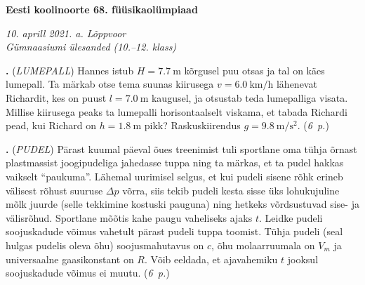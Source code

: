 \documentclass[11pt,a5paper]{article}
\newcommand{\numb}[1]{\vspace{5pt}\textbf{\large #1}}
\newcommand{\nimi}[1]{(\textsl{\small #1})}
\newcommand{\punktid}[1]{(\emph{#1~p.})}
\newcounter{ylesanne}
\newcommand{\yl}[1]{\addtocounter{ylesanne}{1}\numb{\theylesanne.} \nimi{#1} \newblock{}}
\newcommand{\autor}[1]{}
\begin{document}
\begin{center}
  \textbf{\Large Eesti koolinoorte 68. füüsikaolümpiaad} \par
  \emph{10. aprill 2021. a. Lõppvoor \\Gümnaasiumi ülesanded (10.--12. klass)}
\end{center}

 \par

\yl{LUMEPALL}
Hannes istub $H=\SI{7.7}{\m}$ kõrgusel puu otsas ja tal on käes lumepall. Ta märkab otse tema suunas kiirusega $v=\SI{6.0}{\km\per\hour}$ lähenevat Richardit, kes on puust $l=\SI{7.0}{\m}$ kaugusel, ja otsustab teda lumepalliga visata. Millise kiirusega peaks ta lumepalli horisontaalselt viskama, et tabada Richardi pead, kui Richard on $h=\SI{1.8}{\m}$ pikk? Raskuskiirendus $g=\SI{9.8}{\m\per\s\squared}$.
\punktid{6} \autor{Oleg Košik}

\yl{PUDEL}
Pärast kuumal päeval õues treenimist tuli sportlane oma tühja õrnast plastmassist joogipudeliga jahedasse tuppa ning ta märkas, et ta pudel hakkas vaikselt \enquote{paukuma}. Lähemal uurimisel selgus, et kui pudeli sisene rõhk erineb välisest rõhust suuruse $\Delta p$ võrra, siis tekib pudeli kesta sisse üks lohukujuline mõlk juurde (selle tekkimine kostuski pauguna) ning hetkeks võrdsustuvad sise- ja välisrõhud. Sportlane mõõtis kahe paugu vaheliseks ajaks $t$. Leidke pudeli soojuskadude võimus vahetult pärast pudeli tuppa toomist. Tühja pudeli (seal hulgas pudelis oleva õhu) soojusmahutavus on $c$, õhu molaarruumala on $V_m$ ja universaalne gaasikonstant on $R$. Võib eeldada, et ajavahemiku $t$ jooksul soojuskadude võimus ei muutu.
\punktid{6} \autor{Jarl Patrick Paide}
\end{document}
